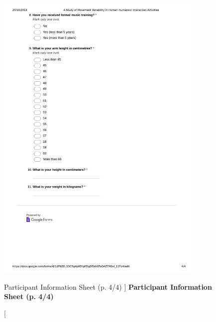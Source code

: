 \begin{figure}
 \centering
   \includegraphics[width=0.9\textwidth]{epi4}
   \caption
	[Participant Information Sheet (p. 4/4) ]{
	{\bf Participant Information Sheet (p. 4/4)}
}
   \label{fig:epi4}
\end{figure}



